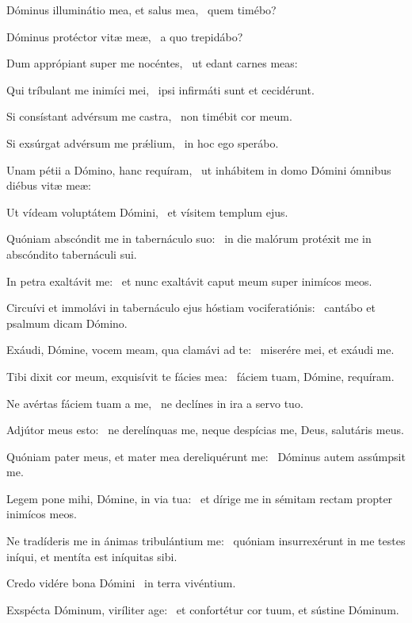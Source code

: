 \item Dóminus illuminátio mea, et salus mea,~\psstar{} quem timébo?

\item Dóminus protéctor vitæ meæ,~\psstar{} a quo trepidábo?

\item Dum apprópiant super me nocéntes,~\psstar{} ut edant carnes meas:

\item Qui tríbulant me inimíci mei,~\psstar{} ipsi infirmáti sunt et cecidérunt.

\item Si consístant advérsum me castra,~\psstar{} non timébit cor meum.

\item Si exsúrgat advérsum me prǽlium,~\psstar{} in hoc ego sperábo.

\item Unam pétii a Dómino, hanc requíram,~\psstar{} ut inhábitem in domo Dómini ómnibus diébus vitæ meæ:

\item Ut vídeam voluptátem Dómini,~\psstar{} et vísitem templum ejus.

\item Quóniam abscóndit me in tabernáculo suo:~\psstar{} in die malórum protéxit me in abscóndito tabernáculi sui.

\item In petra exaltávit me:~\psstar{} et nunc exaltávit caput meum super inimícos meos.

\item Circuívi et immolávi in tabernáculo ejus hóstiam vociferatiónis:~\psstar{} cantábo et psalmum dicam Dómino.

\item Exáudi, Dómine, vocem meam, qua clamávi ad te:~\psstar{} miserére mei, et exáudi me.

\item Tibi dixit cor meum, exquisívit te fácies mea:~\psstar{} fáciem tuam, Dómine, requíram.

\item Ne avértas fáciem tuam a me,~\psstar{} ne declínes in ira a servo tuo.

\item Adjútor meus esto:~\psstar{} ne derelínquas me, neque despícias me, Deus, salutáris meus.

\item Quóniam pater meus, et mater mea dereliquérunt me:~\psstar{} Dóminus autem assúmpsit me.

\item Legem pone mihi, Dómine, in via tua:~\psstar{} et dírige me in sémitam rectam propter inimícos meos.

\item Ne tradíderis me in ánimas tribulántium me:~\psstar{} quóniam insurrexérunt in me testes iníqui, et mentíta est iníquitas sibi.

\item Credo vidére bona Dómini~\psstar{} in terra vivéntium.

\item Exspécta Dóminum, viríliter age:~\psstar{} et confortétur cor tuum, et sústine Dóminum.